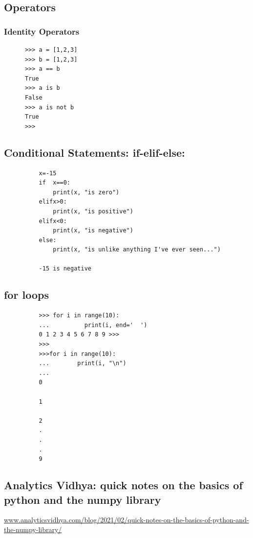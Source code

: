 \documentclass[11pt,a4paper]{article}
\begin{document}
    

    \subsection*{Operators}
    \subsubsection*{Identity Operators}
    \begin{lstlisting}
      >>> a = [1,2,3]
      >>> b = [1,2,3]
      >>> a == b
      True
      >>> a is b
      False
      >>> a is not b
      True
      >>> 
   \end{lstlisting}


    \subsection*{Conditional Statements: if-elif-else:}
        \begin{lstlisting}
          x=-15
          if  x==0:
              print(x, "is zero")
          elifx>0:
              print(x, "is positive")
          elifx<0:
              print(x, "is negative")
          else:
              print(x, "is unlike anything I've ever seen...")

          -15 is negative
      \end{lstlisting}


    \subsection*{for loops}
        \begin{lstlisting}
          >>> for i in range(10): 
          ...          print(i, end='  ')
          0 1 2 3 4 5 6 7 8 9 >>> 
          >>>
          >>>for i in range(10):
          ...        print(i, "\n")
          ... 
          0 
          
          1 
          
          2 
          .
          .
          .
          9 
        \end{lstlisting}


    \subsection*{Analytics Vidhya: quick notes on the basics of python and the numpy library}    
\href{https://www.analyticsvidhya.com/blog/2021/02/quick-notes-on-the-basics-of-python-and-the-numpy-library/}{www.analyticsvidhya.com/blog/2021/02/quick-notes-on-the-basics-of-python-and-the-numpy-library/}
\end{document}
